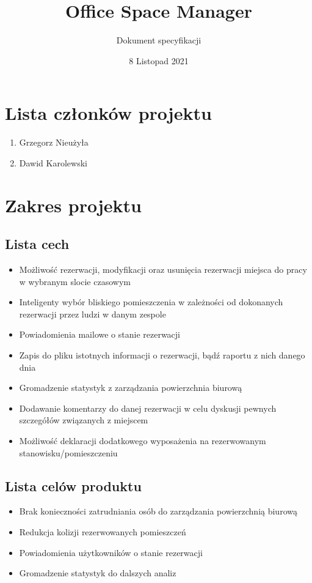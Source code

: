 \documentclass{article}
\title{Office Space Manager}
\author{Dokument specyfikacji}
\date{8 Listopad 2021}
\begin{document}
\maketitle

\section{Lista członków projektu}
\begin{enumerate}
  \item Grzegorz Nieużyła
  \item Dawid Karolewski
\end{enumerate}


\section{Zakres projektu}

\subsection{Lista cech}
\begin{itemize}
  \item Możliwość rezerwacji, modyfikacji oraz usunięcia rezerwacji miejsca do pracy w wybranym slocie czasowym
  \item Inteligenty wybór bliskiego pomieszczenia w zależności od dokonanych rezerwacji przez ludzi w danym zespole
  \item Powiadomienia mailowe o stanie rezerwacji
  \item Zapis do pliku istotnych informacji o rezerwacji, bądź raportu z nich danego dnia
  \item Gromadzenie statystyk z zarządzania powierzchnia biurową
  \item Dodawanie komentarzy do danej rezerwacji w celu dyskusji pewnych szczegółów związanych z miejscem
  \item Możliwość deklaracji dodatkowego wyposażenia na rezerwowanym stanowisku/pomieszczeniu
\end{itemize}

\subsection{Lista celów produktu}
\begin{itemize}
  \item Brak konieczności zatrudniania osób do zarządzania powierzchnią biurową 
  \item Redukcja kolizji rezerwowanych pomieszczeń
  \item Powiadomienia użytkowników o stanie rezerwacji
  \item Gromadzenie statystyk do dalszych analiz
\end{itemize}
\end{document}
